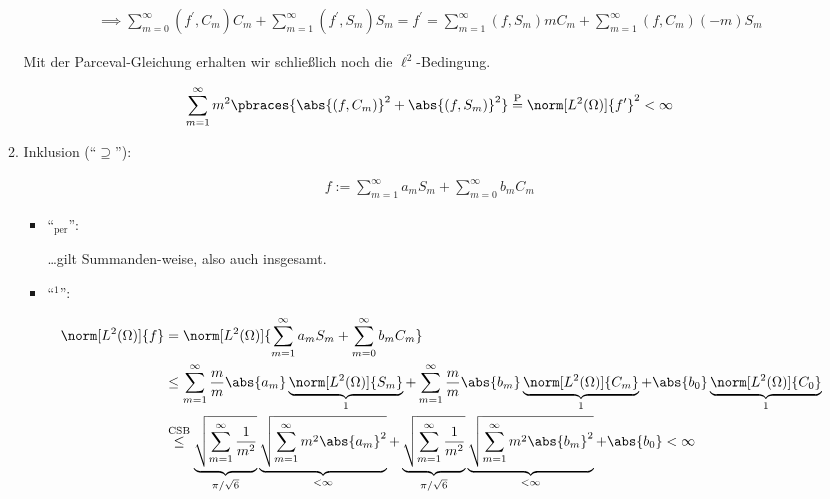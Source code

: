 \begin{solution}
\begin{enumerate}[label = (\roman*)]
\begin{enumerate}
    \begin{align*}
      \implies
      \sum_{m=0}^\infty (f^\prime, C_m) C_m + \sum_{m=1}^\infty (f^\prime, S_m) S_m
      =
      f^\prime
      =
      \sum_{m=1}^\infty (f, S_m) m C_m + \sum_{m=1}^\infty (f, C_m) (-m) S_m
    \end{align*}

    Mit der Parceval-Gleichung erhalten wir schließlich noch die $\ell^2$-Bedingung.

    \begin{align*}
      \sum_{m=1}^\infty m^2 \pbraces{\abs{(f, C_m)}^2 + \abs{(f, S_m)}^2}
      \stackrel
      {
        \mathrm{P}
      }{=}
      \norm[L^2(\Omega)]{f^\prime}^2
      <
      \infty
    \end{align*}

    \item Inklusion (\enquote{$\supseteq$}):

    \begin{align*}
      f
      :=
      \sum_{m=1}^\infty a_m S_m + \sum_{m=0}^\infty b_m C_m
    \end{align*}

    \begin{itemize}

      \item \enquote{$_\mathrm{per}$}:

      \dots gilt Summanden-weise, also auch insgesamt.

      \item \enquote{$^1$}:

      \begin{align*}
        \norm[L^2(\Omega)]{f}
        & =
        \norm[L^2(\Omega)]
        {
          \sum_{m=1}^\infty a_m S_m + \sum_{m=0}^\infty b_m C_m
        } \\
        & \leq
        \sum_{m=1}^\infty \frac{m}{m} \abs{a_m} \underbrace{\norm[L^2(\Omega)]{S_m}}_1
        +
        \sum_{m=1}^\infty \frac{m}{m} \abs{b_m} \underbrace{\norm[L^2(\Omega)]{C_m}}_1
        +
        \abs{b_0} \underbrace{\norm[L^2(\Omega)]{C_0}}_1 \\
        & \stackrel
        {
          \mathrm{CSB}
        }{\leq}
        \underbrace
        {
          \sqrt
          {
            \sum_{m=1}^\infty \frac{1}{m^2}
          }
        }_{
          \pi / \sqrt{6}
        }
        \underbrace
        {
          \sqrt
          {
            \sum_{m=1}^\infty m^2 \abs{a_m}^2
          }
        }_{
          < \infty
        }
        +
        \underbrace
        {
          \sqrt
          {
            \sum_{m=1}^\infty \frac{1}{m^2}
          }
        }_{
          \pi / \sqrt{6}
        }
        \underbrace
        {
          \sqrt
          {
            \sum_{m=1}^\infty m^2 \abs{b_m}^2
          }
        }_{
          < \infty
        }
        +
        \abs{b_0}        <
        \infty
      \end{align*}


\end{itemize}
\end{enumerate}
\end{enumerate}
\end{solution}
